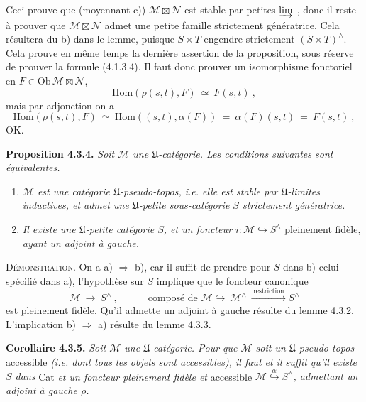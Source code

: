 \documentclass[11pt]{article}
\newcommand{\printedpage}[1]{\if\relax\detokenize{#1}\relax\else\marginpar{\footnotesize p.~#1}\fi}
\newcommand{\msp}[1]{\marginpar{\footnotesize [#1]}}
\newcommand{\Hom}{\mathrm{Hom}}
\newcommand{\Ob}{\mathrm{Ob}\,}
\begin{document}
\noindent Ceci prouve que (moyennant c)) $\mathcal M\boxtimes\mathcal N$ est stable par petites $\varinjlim$ , donc il reste à prouver que $\mathcal M\boxtimes\mathcal N$ admet une petite famille strictement génératrice. Cela résultera du b) dans le lemme, puisque $S\times T$ engendre strictement $(S\times T)^\wedge$. Cela prouve en même temps la dernière assertion de la proposition, sous réserve de prouver la formule (4.1.3.4). Il faut donc prouver un isomorphisme fonctoriel en $F\in\Ob\mathcal M\boxtimes\mathcal N$, %
\[
\Hom(\rho(s,t),F)\ \simeq\ F(s,t)\ ,
\]
mais par adjonction on a
\[
\Hom(\rho(s,t),F)\ \simeq\ \Hom((s,t),\alpha(F))\ =\ \alpha(F)(s,t)\ =\ F(s,t)\ ,
\]
OK.

\printedpage{11}

\noindent\msp{page 69}\textbf{Proposition 4.3.4.} \textit{Soit $\mathcal M$ une $\mathfrak U$-catégorie. Les conditions suivantes sont équivalentes.}
\begin{enumerate}[label={}]
\item[\textit{a)}] \textit{$\mathcal M$ est une catégorie $\mathfrak U$-pseudo-topos, i.e. elle est stable par $\mathfrak U$-limites inductives, et admet une $\mathfrak U$-petite sous-catégorie $S$ strictement génératrice.}
\item[\textit{b)}] \textit{Il existe une $\mathfrak U$-petite catégorie $S$, et un foncteur $i:\mathcal M\hookrightarrow S^\wedge$} pleinement fidèle, \textit{ayant un adjoint à gauche.}
\end{enumerate}

\noindent\textsc{Démonstration}. On a a) $\Longrightarrow$ b), car il suffit de prendre pour $S$ dans b) celui spécifié dans a), l'hypothèse sur $S$ implique que le foncteur canonique
\[
\mathcal M\ \longrightarrow\ S^\wedge\ ,\qquad\quad \text{composé de } \mathcal M\hookrightarrow\ \mathcal M^\wedge\ \xrightarrow{\ \text{restriction}\ }S^\wedge
\]
est pleinement fidèle. Qu'il admette un adjoint à gauche résulte du lemme 4.3.2. L'implication b) $\Longrightarrow$ a) résulte du lemme 4.3.3.

\noindent\textbf{Corollaire 4.3.5.} \textit{Soit $\mathcal M$ une $\mathfrak U$-catégorie. Pour que $\mathcal M$ soit un $\mathfrak U$-pseudo-topos} accessible \textit{(i.e. dont tous les objets sont accessibles), il faut et il suffit qu'il existe $S$ dans} Cat \textit{et un foncteur pleinement fidèle et} accessible $\mathcal M\overset{\alpha}{\hookrightarrow}S^\wedge$\textit{, admettant un adjoint à gauche $\rho$.}
\end{document}
